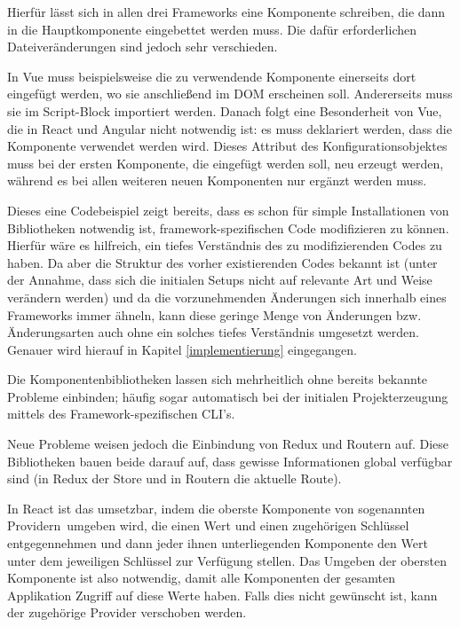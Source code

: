 Hierfür lässt sich in allen drei Frameworks eine Komponente schreiben, die dann in die Hauptkomponente eingebettet werden muss. Die dafür erforderlichen Dateiveränderungen sind jedoch sehr verschieden.

In Vue muss beispielsweise die zu verwendende Komponente einerseits dort eingefügt werden, wo sie anschließend im \gls{DOM} erscheinen soll. Andererseits muss sie im Script-Block importiert werden. Danach folgt eine Besonderheit von Vue, die in React und Angular nicht notwendig ist: es muss deklariert werden, dass die Komponente verwendet werden wird. Dieses Attribut des Konfigurationsobjektes muss bei der ersten Komponente, die eingefügt werden soll, neu erzeugt werden, während es bei allen weiteren neuen Komponenten nur ergänzt werden muss.

Dieses eine Codebeispiel zeigt bereits, dass es schon für simple Installationen von Bibliotheken notwendig ist, framework-spezifischen Code modifizieren zu können. Hierfür wäre es hilfreich, ein tiefes Verständnis des zu modifizierenden Codes zu haben. Da aber die Struktur des vorher existierenden Codes bekannt ist (unter der Annahme, dass sich die initialen Setups nicht auf relevante Art und Weise verändern werden) und da die vorzunehmenden Änderungen sich innerhalb eines Frameworks immer ähneln, kann diese geringe Menge von Änderungen bzw. Änderungsarten auch ohne ein solches tiefes Verständnis umgesetzt werden. Genauer wird hierauf in Kapitel \ref{implementierung} eingegangen.

Die Komponentenbibliotheken lassen sich mehrheitlich ohne bereits bekannte Probleme einbinden; häufig sogar automatisch bei der initialen Projekterzeugung mittels des Framework-spezifischen \gls{CLI}'s.

Neue Probleme weisen jedoch die Einbindung von Redux und Routern auf. Diese Bibliotheken bauen beide darauf auf, dass gewisse Informationen global verfügbar sind (in Redux der Store und in Routern die aktuelle Route).

In React ist das umsetzbar, indem die oberste Komponente von sogenannten \glqq Providern\grqq\ umgeben wird, die einen Wert und einen zugehörigen Schlüssel entgegennehmen und dann jeder ihnen unterliegenden Komponente den Wert unter dem jeweiligen Schlüssel zur Verfügung stellen. Das Umgeben der obersten Komponente ist also notwendig, damit alle Komponenten der gesamten Applikation Zugriff auf diese Werte haben. Falls dies nicht gewünscht ist, kann der zugehörige Provider verschoben werden.

